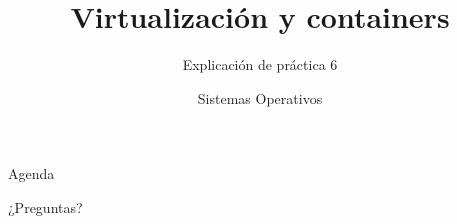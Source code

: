 


\title{Virtualización y containers}
\author{Sistemas Operativos}
\subtitle{Explicación de práctica 6}



\begin{frame}
  \titlepage
\end{frame}

\begin{frame}{Agenda}
  \tableofcontents
\end{frame}



\begin{frame}{}
  \begin{center}
    \vfill
    \huge ¿Preguntas?
    \vfill
  \end{center}
\end{frame}


